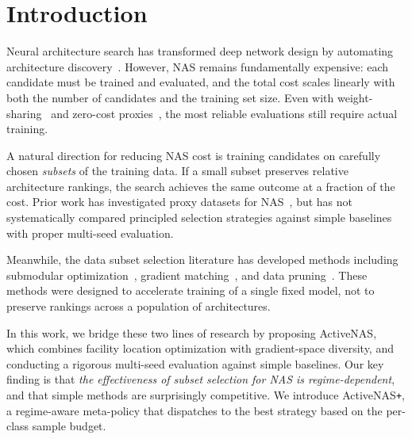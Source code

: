 \documentclass{cvpr}
\newcommand{\method}{ActiveNAS}
\newcommand{\methodplus}{ActiveNAS\texttt{+}}
\begin{document}
\section{Introduction}
\label{sec:intro}

Neural architecture search has transformed deep network design by automating architecture discovery~\cite{zoph2017neural,real2019regularized,liu2019darts}. However, NAS remains fundamentally expensive: each candidate must be trained and evaluated, and the total cost scales linearly with both the number of candidates and the training set size. Even with weight-sharing~\cite{liu2019darts} and zero-cost proxies~\cite{abdelfattah2021zerocost,mellor2021naswot,tanaka2020synflow,chen2021tenas}, the most reliable evaluations still require actual training.

A natural direction for reducing NAS cost is training candidates on carefully chosen \emph{subsets} of the training data. If a small subset preserves relative architecture rankings, the search achieves the same outcome at a fraction of the cost. Prior work has investigated proxy datasets for NAS~\cite{na2021accelerating,moser2022less,coleman2020selection}, but has not systematically compared principled selection strategies against simple baselines with proper multi-seed evaluation.

Meanwhile, the data subset selection literature has developed methods including submodular optimization~\cite{wei2015submodularity,mirzasoleiman2020craig}, gradient matching~\cite{killamsetty2021gradmatch,killamsetty2021glister}, and data pruning~\cite{sorscher2022beyond,yang2023crest}. These methods were designed to accelerate training of a single fixed model, not to preserve rankings across a population of architectures.

In this work, we bridge these two lines of research by proposing \method{}, which combines facility location optimization with gradient-space diversity, and conducting a rigorous multi-seed evaluation against simple baselines. Our key finding is that \emph{the effectiveness of subset selection for NAS is regime-dependent}, and that simple methods are surprisingly competitive. We introduce \methodplus{}, a regime-aware meta-policy that dispatches to the best strategy based on the per-class sample budget.
\end{document}
